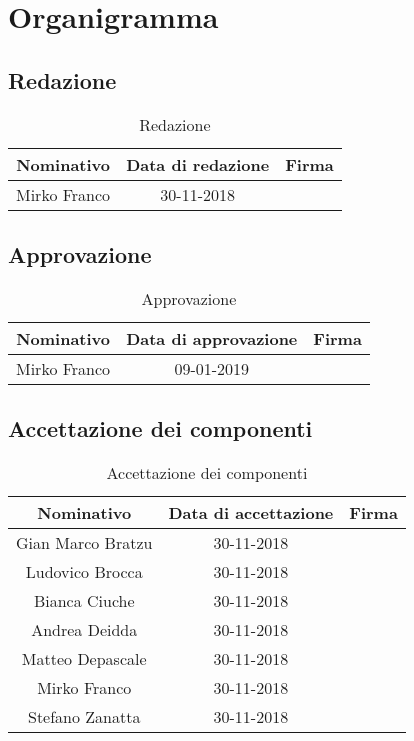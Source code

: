 \chapter{Organigramma}
\section{Redazione}
	\begin{table}[htp]
		\centering
		\caption{Redazione}
			\begin{tabular}{|c|c|c|}
				\hline
				\textbf{Nominativo} & \textbf{Data di redazione} & \textbf{Firma} \\
				\hline 
				Mirko Franco & 30-11-2018 &  \\
				\hline
			\end{tabular}
	\end{table}
\section{Approvazione}
\begin{table}[htp]
	\centering
	\caption{Approvazione}
	\begin{tabular}{|c|c|c|}
		\hline
		\textbf{Nominativo} & \textbf{Data di approvazione} & \textbf{Firma} \\
		\hline 
		Mirko Franco & 09-01-2019 &  \\
		\hline
	\end{tabular}
\end{table}
\clearpage
\section{Accettazione dei componenti}
	\begin{table}[htp]
		\centering
		\caption{Accettazione dei componenti}
		\begin{tabular}{|c|c|c|}
			\hline
			\textbf{Nominativo} & \textbf{Data di accettazione} & \textbf{Firma} \\
			\hline 
			Gian Marco Bratzu & 30-11-2018 & \\
			Ludovico Brocca & 30-11-2018 & \\
			Bianca Ciuche & 30-11-2018 & \\
			Andrea Deidda & 30-11-2018 & \\
			Matteo Depascale & 30-11-2018 & \\
	 		Mirko Franco & 30-11-2018 &  \\
	 		Stefano Zanatta & 30-11-2018 & \\
			\hline
		\end{tabular}
	\end{table}
